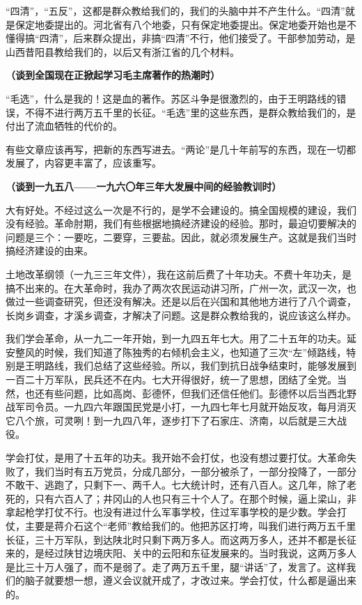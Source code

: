 “四清”，“五反”，这都是群众教给我们的，我们的头脑中并不产生什么。“四清”就是保定地委提出的。河北省有八个地委，只有保定地委提出。保定地委开始也是不懂得搞“四清”，后来群众提出，非搞“四清”不行，他们接受了。干部参加劳动，是山西昔阳县教给我们的，以后又有浙江省的几个材料。

\textbf{（谈到全国现在正掀起学习毛主席著作的热潮时）}

“毛选”，什么是我的！这是血的著作。苏区斗争是很激烈的，由于王明路线的错误，不得不进行两万五千里的长征。“毛选”里的这些东西，是群众教给我们的，是付出了流血牺牲的代价的。

有些文章应该再写，把新的东西写进去。“两论”是几十年前写的东西，现在一切都发展了，内容更丰富了，应该重写。

\textbf{（谈到一九五八——一九六〇年三年大发展中间的经验教训时）}

大有好处。不经过这么一次是不行的，是学不会建设的。搞全国规模的建设，我们没有经验。革命肘期，我们有些根据地搞经济建设的经验。那时，最迫切要解决的问题是三个：一要吃，二要穿，三要盐。因此，就必须发展生产。这就是我们当时搞经济建设的由来。

土地改革纲领（一九三三年文件），我在这前后费了十年功夫。不费十年功夫，是搞不出来的。在大革命时，我办了两次农民运动讲习所，广州一次，武汉一次，也做过一些调查研究，但还没有解决。还是以后在兴国和其他地方进行了八个调查，长岗乡调查，才溪乡调查，才解决了问题。这是群众教给我的，说应该这么样办。

我们学会革命，从一九二一年开始，到一九四五年七大。用了二十五年的功夫。延安整风的时候，我们知道了陈独秀的右倾机会主义，也知道了三次“左”倾路线，特别是王明路线，我们总结了这些经验。所以，我们到抗日战争结束时，能够发展到一百二十万军队，民兵还不在内。七大开得很好，统一了思想，团结了全党。当然，也还有些问题，比如高岗、彭德怀，但我们还信任他们。彭德怀以后当西北野战军司令员。一九四六年跟国民党是小打，一九四七年七月就开始反攻，每月消灭它八个旅，可灵咧！到一九四八年，逐步打下了石家庄、济南，以后就是三大战役。

学会打仗，是用了十五年的功夫。我开始不会打仗，也没有想过要打仗。大革命失败了，我们当时有五万党员，分成几部分，一部分被杀了，一部分投降了，一部分不敢干、逃跑了，只剩下一、两千人。七大统计时，还有八百人。这几年，除了老死的，只有六百人了；井冈山的人也只有三十个人了。在那个时候，逼上梁山，非拿起枪学打仗不行。也没有进过什么军事学校，住过军事学校的是少数。学会打仗，主要是蒋介石这个“老师”教给我们的。他把苏区打垮，叫我们进行两万五千里长征，三十万军队，到达陕北时只剩下两万多人。而这两万多人，还并不都是长征来的，是经过陕甘边境庆阳、关中的云阳和东征发展来的。当时我说，这两万多人是比三十万人强了，而不是弱了。走了两万五千里，腿“讲话”了，发言了。这样我们的脑子就要想一想，遵义会议就开成了，才改过来。学会打仗，什么都是逼出来的。

